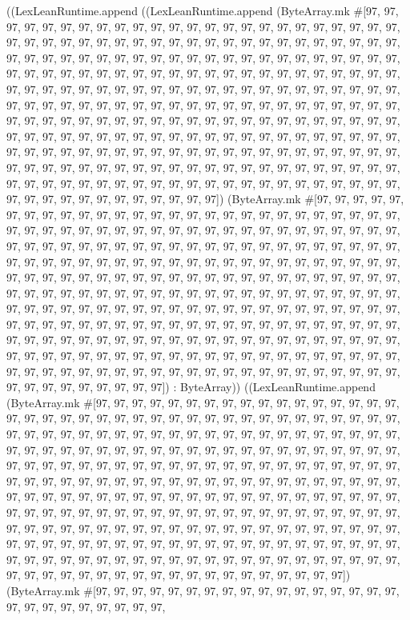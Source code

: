 \documentclass[11pt]{article}
\begin{document}
((LexLeanRuntime.append ((LexLeanRuntime.append (ByteArray.mk \#[97, 97, 97, 97, 97, 97, 97, 97, 97, 97, 97, 97, 97, 97, 97, 97, 97, 97, 97, 97, 97, 97, 97, 97, 97, 97, 97, 97, 97, 97, 97, 97, 97, 97, 97, 97, 97, 97, 97, 97, 97, 97, 97, 97, 97, 97, 97, 97, 97, 97, 97, 97, 97, 97, 97, 97, 97, 97, 97, 97, 97, 97, 97, 97, 97, 97, 97, 97, 97, 97, 97, 97, 97, 97, 97, 97, 97, 97, 97, 97, 97, 97, 97, 97, 97, 97, 97, 97, 97, 97, 97, 97, 97, 97, 97, 97, 97, 97, 97, 97, 97, 97, 97, 97, 97, 97, 97, 97, 97, 97, 97, 97, 97, 97, 97, 97, 97, 97, 97, 97, 97, 97, 97, 97, 97, 97, 97, 97, 97, 97, 97, 97, 97, 97, 97, 97, 97, 97, 97, 97, 97, 97, 97, 97, 97, 97, 97, 97, 97, 97, 97, 97, 97, 97, 97, 97, 97, 97, 97, 97, 97, 97, 97, 97, 97, 97, 97, 97, 97, 97, 97, 97, 97, 97, 97, 97, 97, 97, 97, 97, 97, 97, 97, 97, 97, 97, 97, 97, 97, 97, 97, 97, 97, 97, 97, 97, 97, 97, 97, 97, 97, 97, 97, 97, 97, 97, 97, 97, 97, 97, 97, 97, 97, 97, 97, 97, 97, 97, 97, 97, 97, 97, 97, 97, 97, 97, 97, 97, 97, 97, 97, 97, 97, 97, 97, 97, 97, 97, 97, 97, 97, 97, 97, 97, 97, 97, 97, 97, 97, 97, 97, 97, 97, 97, 97, 97]) (ByteArray.mk \#[97, 97, 97, 97, 97, 97, 97, 97, 97, 97, 97, 97, 97, 97, 97, 97, 97, 97, 97, 97, 97, 97, 97, 97, 97, 97, 97, 97, 97, 97, 97, 97, 97, 97, 97, 97, 97, 97, 97, 97, 97, 97, 97, 97, 97, 97, 97, 97, 97, 97, 97, 97, 97, 97, 97, 97, 97, 97, 97, 97, 97, 97, 97, 97, 97, 97, 97, 97, 97, 97, 97, 97, 97, 97, 97, 97, 97, 97, 97, 97, 97, 97, 97, 97, 97, 97, 97, 97, 97, 97, 97, 97, 97, 97, 97, 97, 97, 97, 97, 97, 97, 97, 97, 97, 97, 97, 97, 97, 97, 97, 97, 97, 97, 97, 97, 97, 97, 97, 97, 97, 97, 97, 97, 97, 97, 97, 97, 97, 97, 97, 97, 97, 97, 97, 97, 97, 97, 97, 97, 97, 97, 97, 97, 97, 97, 97, 97, 97, 97, 97, 97, 97, 97, 97, 97, 97, 97, 97, 97, 97, 97, 97, 97, 97, 97, 97, 97, 97, 97, 97, 97, 97, 97, 97, 97, 97, 97, 97, 97, 97, 97, 97, 97, 97, 97, 97, 97, 97, 97, 97, 97, 97, 97, 97, 97, 97, 97, 97, 97, 97, 97, 97, 97, 97, 97, 97, 97, 97, 97, 97, 97, 97, 97, 97, 97, 97, 97, 97, 97, 97, 97, 97, 97, 97, 97, 97, 97, 97, 97, 97, 97, 97, 97, 97, 97, 97, 97, 97, 97, 97, 97, 97, 97, 97, 97, 97, 97, 97, 97, 97, 97, 97, 97, 97, 97, 97]) : ByteArray)) ((LexLeanRuntime.append (ByteArray.mk \#[97, 97, 97, 97, 97, 97, 97, 97, 97, 97, 97, 97, 97, 97, 97, 97, 97, 97, 97, 97, 97, 97, 97, 97, 97, 97, 97, 97, 97, 97, 97, 97, 97, 97, 97, 97, 97, 97, 97, 97, 97, 97, 97, 97, 97, 97, 97, 97, 97, 97, 97, 97, 97, 97, 97, 97, 97, 97, 97, 97, 97, 97, 97, 97, 97, 97, 97, 97, 97, 97, 97, 97, 97, 97, 97, 97, 97, 97, 97, 97, 97, 97, 97, 97, 97, 97, 97, 97, 97, 97, 97, 97, 97, 97, 97, 97, 97, 97, 97, 97, 97, 97, 97, 97, 97, 97, 97, 97, 97, 97, 97, 97, 97, 97, 97, 97, 97, 97, 97, 97, 97, 97, 97, 97, 97, 97, 97, 97, 97, 97, 97, 97, 97, 97, 97, 97, 97, 97, 97, 97, 97, 97, 97, 97, 97, 97, 97, 97, 97, 97, 97, 97, 97, 97, 97, 97, 97, 97, 97, 97, 97, 97, 97, 97, 97, 97, 97, 97, 97, 97, 97, 97, 97, 97, 97, 97, 97, 97, 97, 97, 97, 97, 97, 97, 97, 97, 97, 97, 97, 97, 97, 97, 97, 97, 97, 97, 97, 97, 97, 97, 97, 97, 97, 97, 97, 97, 97, 97, 97, 97, 97, 97, 97, 97, 97, 97, 97, 97, 97, 97, 97, 97, 97, 97, 97, 97, 97, 97, 97, 97, 97, 97, 97, 97, 97, 97, 97, 97, 97, 97, 97, 97, 97, 97, 97, 97, 97, 97, 97, 97, 97, 97, 97, 97, 97, 97]) (ByteArray.mk \#[97, 97, 97, 97, 97, 97, 97, 97, 97, 97, 97, 97, 97, 97, 97, 97, 97, 97, 97, 97, 97, 97, 97, 97, 97, 97, 
\end{document}
